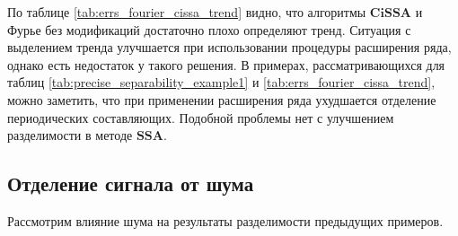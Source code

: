 \documentclass[a4paper, 11pt]{article}
\newcommand{\SSA}{\textbf{SSA}}
\newcommand{\CISSA}{\textbf{CiSSA}}
\begin{document}
По таблице \ref{tab:errs_fourier_cissa_trend} видно, что алгоритмы $\CISSA$ и Фурье без модификаций достаточно плохо определяют тренд. Ситуация с выделением тренда улучшается при использовании процедуры расширения ряда, однако есть недостаток у такого решения. В примерах, рассматривающихся  для таблиц \ref{tab:precise_separability_example1} и \ref{tab:errs_fourier_cissa_trend}, можно заметить, что при применении расширения ряда ухудшается отделение периодических составляющих. Подобной проблемы нет с улучшением разделимости в методе $\SSA$.

\subsection{Отделение сигнала от шума}


Рассмотрим влияние шума на результаты разделимости предыдущих примеров.
\end{document}
